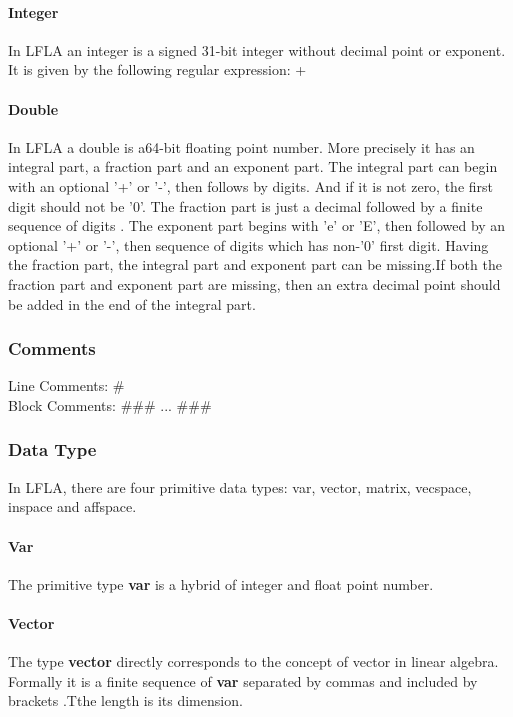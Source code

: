 \documentclass[12pt]{article} %
\begin{document}
\paragraph{Integer}  In LFLA an integer  is a signed 31-bit  integer without decimal point or exponent. It is given by  the following regular expression:
\newline
 [+ - ][ '0' -  '9 ']+
\paragraph{Double} In LFLA a double is a64-bit floating point number. More precisely it has an integral part, a fraction part and an exponent part. The integral part can begin with an optional '+' or '-', then follows by digits. And if it is not zero, the first digit should not be '0'. The fraction part is just a decimal followed by a finite sequence of digits . The exponent part begins with 'e' or 'E', then followed by an optional '+' or '-', then sequence of digits which has non-'0' first digit. Having the fraction part, the integral part and exponent part can be missing.If both the fraction part and exponent part are missing, then an extra decimal point should be added in the end of the integral part.


\subsubsection{Comments}
Line Comments: \# \\
\indent Block Comments: \#\#\# ... \#\#\#

\subsubsection{Data Type}
In LFLA, there are four primitive data types: var, vector, matrix, vecspace, inspace and affspace.

\paragraph{Var}
The primitive type \textbf{var} is a hybrid of integer and float point number.
	
	
\paragraph{Vector}
The type \textbf{vector} directly corresponds to the concept of vector in linear algebra. Formally it is a finite sequence of \textbf{var} separated by commas and  included by brackets .Tthe length is its dimension.    
 
\end{document}
